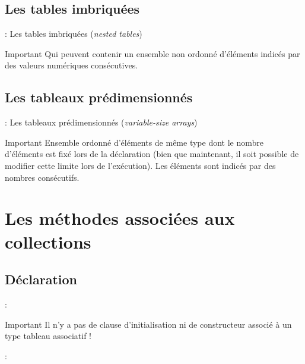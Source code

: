 \documentclass[10pt]{beamer}
\begin{document}
\subsection{Les tables imbriquées}
\begin{frame}{\secname : \subsecname}
    Les tables imbriquées (\emph{nested tables})
    \begin{alertblock}{Important}
        Qui peuvent contenir un ensemble non ordonné d'éléments indicés par des valeurs numériques consécutives.
    \end{alertblock}
\end{frame}
\subsection{Les tableaux prédimensionnés}
\begin{frame}{\secname : \subsecname}
    Les tableaux prédimensionnés (\emph{variable-size arrays})
    \begin{alertblock}{Important}
        Ensemble ordonné d'éléments de même type dont le nombre d'éléments est fixé lors de la déclaration (bien que maintenant, il soit possible de modifier cette limite lors de l'exécution).  Les éléments sont indicés par des nombres consécutifs.
    \end{alertblock}
\end{frame}
\section{Les méthodes associées aux collections}
\tocss
\subsection{Déclaration}
\begin{frame}{\secname : \subsecname}
    \begin{alertblock}{Important}
        Il n'y a pas de clause d'initialisation ni de constructeur associé à un type tableau associatif !
    \end{alertblock}
    
\end{frame}

\begin{frame}{\secname : \subsecname}
    
\end{frame}
\end{document}
